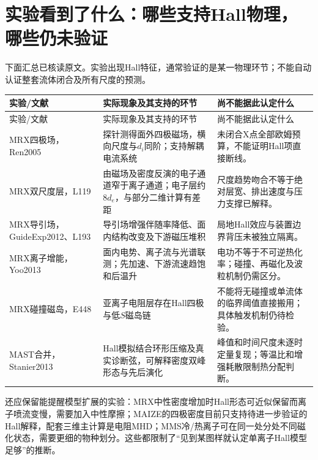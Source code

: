 \section{实验看到了什么：哪些支持Hall物理，哪些仍未验证}
下面汇总已核读原文。实验出现Hall特征，通常验证的是某一物理环节；不能自动认证整套流体闭合及所有尺度的预测。
\begin{longtable}{P{27mm}P{62mm}P{59mm}}
\toprule 实验/文献 & 实际现象及其支持的环节 & 尚不能据此认定什么\\\midrule\endfirsthead
\toprule 实验/文献 & 实际现象及其支持的环节 & 尚不能据此认定什么\\\midrule\endhead
MRX四极场，Ren2005 & 探针测得面外四极磁场，横向尺度与$d_i$同阶；支持解耦电流系统 & 未闭合X点全部欧姆预算，不能证明Hall项直接断线。\\
MRX双尺度层，L119 & 由磁场及密度反演的电子通道窄于离子通道；电子层约$8d_e$，与部分二维计算有差距 & 尺度趋势吻合不等于绝对层宽、排出速度与压力支撑已解释。\\
MRX导引场，GuideExp2012、L193 & 导引场增强伴随率降低、面内结构改变及下游磁压堆积 & 局地Hall效应与装置边界背压未被独立隔离。\\
MRX离子增能，Yoo2013 & 面内电势、离子流与光谱联测；先加速、下游流速趋饱和后温升 & 电功不等于不可逆热化率；碰撞、再磁化及波粒机制仍需区分。\\
MRX碰撞磁岛，E448 & 亚离子电阻层存在Hall四极与低$S$磁岛链 & 不能将无碰撞或单流体的临界阈值直接搬用；具体触发机制仍待检验。\\
MAST合并，Stanier2013 & Hall模拟结合环形压缩及真实诊断弦，可解释密度双峰形态与先后演化 & 峰值和时间尺度未逐时定量复现；等温比和增强耗散限制热分配判断。\\
\bottomrule
\end{longtable}
\citep{Ren2005,L119,GuideExp2012,L193,Yoo2013,E448,Stanier2013}

还应保留能提醒模型扩展的实验：MRX中性密度增加时Hall形态可近似保留而离子喷流变慢，需要加入中性摩擦；MAIZE的四极密度目前只支持待进一步验证的Hall解释，配套三维主计算是电阻MHD；MMS冷/热离子可在同一处分处不同磁化状态，需要更细的物种划分。这些都限制了“见到某图样就认定单离子Hall模型足够”的推断。\citep{L190,F703,L227}


